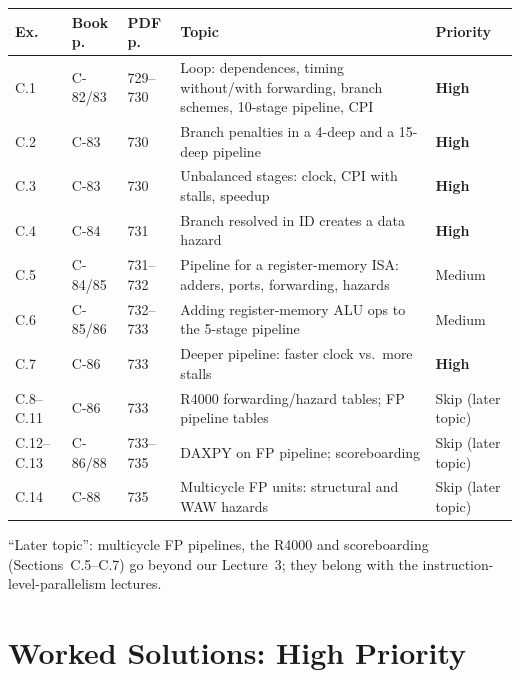 \documentclass[11pt]{article}
\begin{document}
\begin{center}
\small
\renewcommand{\arraystretch}{1.15}
\begin{tabular}{@{}lll>{\raggedright\arraybackslash}p{5.4cm}l@{}}
\toprule
Ex. & Book p. & PDF p. & Topic & Priority \\
\midrule
C.1 & C-82/83 & 729--730 & Loop: dependences, timing without/with forwarding, branch schemes, 10-stage pipeline, CPI & \textbf{High} \\
C.2 & C-83 & 730 & Branch penalties in a 4-deep and a 15-deep pipeline & \textbf{High} \\
C.3 & C-83 & 730 & Unbalanced stages: clock, CPI with stalls, speedup & \textbf{High} \\
C.4 & C-84 & 731 & Branch resolved in ID creates a data hazard & \textbf{High} \\
C.5 & C-84/85 & 731--732 & Pipeline for a register-memory ISA: adders, ports, forwarding, hazards & Medium \\
C.6 & C-85/86 & 732--733 & Adding register-memory ALU ops to the 5-stage pipeline & Medium \\
C.7 & C-86 & 733 & Deeper pipeline: faster clock vs.\ more stalls & \textbf{High} \\
C.8--C.11 & C-86 & 733 & R4000 forwarding/hazard tables; FP pipeline tables & Skip (later topic) \\
C.12--C.13 & C-86/88 & 733--735 & DAXPY on FP pipeline; scoreboarding & Skip (later topic) \\
C.14 & C-88 & 735 & Multicycle FP units: structural and WAW hazards & Skip (later topic) \\
\bottomrule
\end{tabular}
\end{center}
``Later topic'': multicycle FP pipelines, the R4000 and scoreboarding
(Sections~C.5--C.7) go beyond our Lecture~3; they belong with the
instruction-level-parallelism lectures.

\section{Worked Solutions: High Priority}
\end{document}
